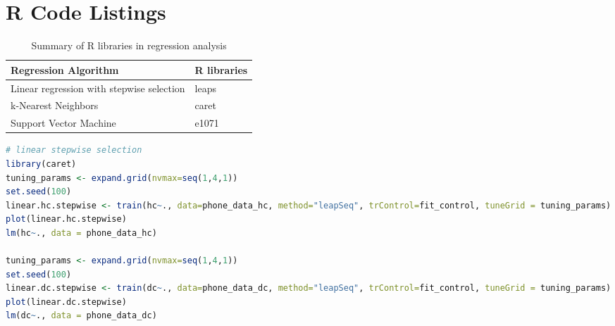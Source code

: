 \chapter{R Code Listings}
\label{ch:R-code-listings}

\begin{table}[h]
\centering
\caption{Summary of R libraries in regression analysis}
\label{tab:r-library-summary}
\begin{tabular}{ll}
\toprule
Regression Algorithm                      & R libraries \\ \midrule
Linear regression with stepwise selection & leaps       \\
k-Nearest Neighbors                       & caret       \\
Support Vector Machine                    & e1071      \\
\bottomrule
\end{tabular}
\end{table}


\begin{lstlisting}[language=R, caption=Tuning linear regression with stepwise selection. Number of predictor \texttt{nvmax} is the tuning parameter. , label=r-code-linear-regr]
# linear stepwise selection
library(caret)
tuning_params <- expand.grid(nvmax=seq(1,4,1))
set.seed(100)
linear.hc.stepwise <- train(hc~., data=phone_data_hc, method="leapSeq", trControl=fit_control, tuneGrid = tuning_params)
plot(linear.hc.stepwise)
lm(hc~., data = phone_data_hc)

tuning_params <- expand.grid(nvmax=seq(1,4,1))
set.seed(100)
linear.dc.stepwise <- train(dc~., data=phone_data_dc, method="leapSeq", trControl=fit_control, tuneGrid = tuning_params)
plot(linear.dc.stepwise)
lm(dc~., data = phone_data_dc)
\end{lstlisting}















